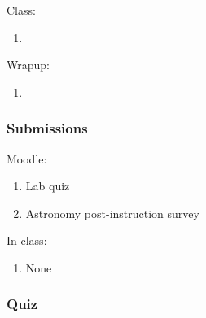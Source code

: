 \documentclass[12pt]{article}
\begin{document}
\noindent
Class:
\begin{enumerate}
\item
\end{enumerate}

\noindent
Wrapup:
\begin{enumerate}
\item
\end{enumerate}


\subsubsection{Submissions}

Moodle:
\begin{enumerate}
\item Lab quiz
\item Astronomy post-instruction survey
\end{enumerate}

\noindent
In-class:
\begin{enumerate}
\item None
\end{enumerate}


\subsubsection{Quiz}
\end{document}
